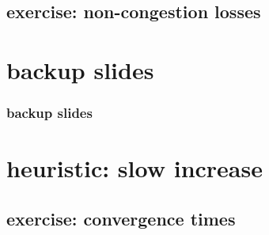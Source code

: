 \subsection{exercise: non-congestion losses} %









\section{backup slides}
\begin{frame}\frametitle{backup slides}
\end{frame}
\section{heuristic: slow increase}


\subsection{exercise: convergence times}






